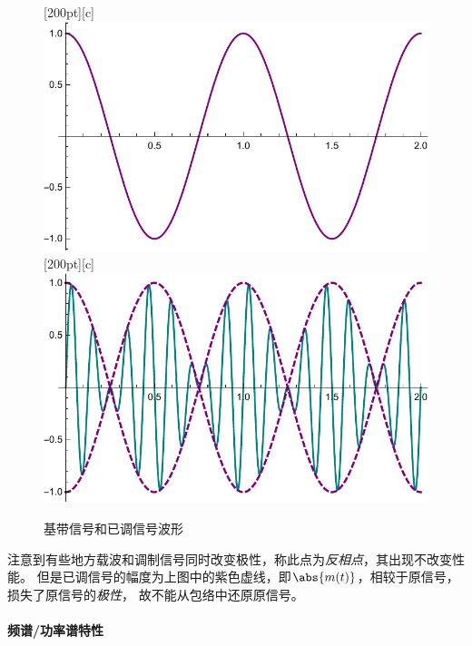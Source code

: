     \begin{figure}[H]
        \centering
        [200pt][c]{\includegraphics[scale=0.5]{body/image/book422a.pdf}}
        [200pt][c]{\includegraphics[scale=0.5]{body/image/book422b.pdf}}
        \caption{基带信号和已调信号波形}
    \end{figure}

    注意到有些地方载波和调制信号同时改变极性，称此点为\emph{反相点}，其出现不改变性能。
    但是已调信号的幅度为上图中的紫色虚线，即$\abs{m(t)}$，相较于原信号，损失了原信号的\emph{极性}，
    故不能从包络中还原原信号。
    
    \paragraph{频谱/功率谱特性}\mbox{}

